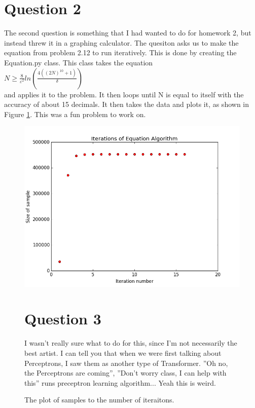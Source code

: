 \documentclass[a4paper]{article}
\begin{document}
\section{Question 2}
The second question is something that I had wanted to do for homework 2, but instead threw it in a graphing calculator. The quesiton asks us to make the equation from problem 2.12 to run iteratively. This is done by creating the Equation.py class. This class takes the equation\\
$N\geq\frac{8}{\varepsilon^2}ln(\frac{4((2N)^{10}+1)}{\delta})$\\
 and applies it to the problem. It then loops until N is equal to itself with the accuracy of about 15 decimals. It then takes the data and plots it, as shown in Figure \ref{fig:Figure3}. This was a fun problem to work on. 
 \begin{figure}
  \includegraphics[width=\linewidth]{plot.png}
  \caption{The plot of samples to the number of iteraitons.}
  \label{fig:Figure3}
  
\section{Question 3}
I wasn't really sure what to do for this, since I'm not necessarily the best artist. I can tell you that when we were first talking about Perceptrons, I saw them as another type of Transformer. ''Oh no, the Perceptrons are coming'', ''Don't worry class, I can help with this''  runs preceptron learning algorithm... Yeah this is weird.
  \end{figure}
\end{document}
